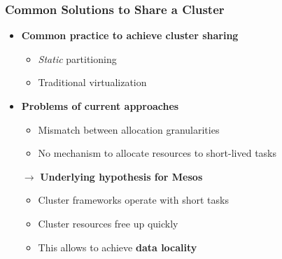 \begin{frame}
\frametitle{Common Solutions to Share a Cluster}
\begin{itemize}
	\item {\bf Common practice to achieve cluster sharing}
	\begin{itemize}
		\item {\it Static} partitioning
		\item Traditional virtualization
	\end{itemize}

\vspace{20pt}

	\item {\bf Problems of current approaches}
	\begin{itemize}
		\item Mismatch between allocation granularities
		\item No mechanism to allocate resources to short-lived tasks
	\end{itemize}

\vspace{20pt}

	\item[$\to$] {\bf Underlying hypothesis for Mesos}
	\begin{itemize}
		\item Cluster frameworks operate with short tasks
		\item Cluster resources free up quickly
		\item This allows to achieve {\bf data locality}
	\end{itemize}
\end{itemize}
\end{frame}

